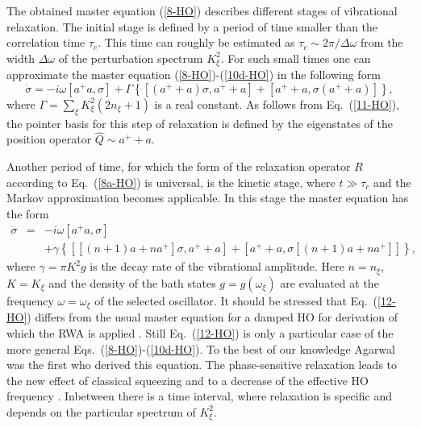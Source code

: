 \documentclass[12pt,twoside,a4paper]{report}
\begin{document}
The obtained master equation (\ref{8-HO})
describes different stages of vibrational relaxation. 
The initial stage is defined by a period of time smaller than the
correlation time $\tau _c$. 
This time can roughly be estimated as  $\tau _c\sim 2\pi/\Delta \omega $ from the width $\Delta \omega $ of the
perturbation spectrum $K_\xi ^2$.
For such small times one can approximate
the master equation (\ref{8-HO})-(\ref{10d-HO}) in the following form
\begin{equation}
  \dot{\sigma} 
        = -{{i}}\omega \left[ a^{+}a,\sigma \right] \label{11-HO}  
            +\Gamma
                \left\{
                    \left[
                        \left( a^{+}+a \right) \sigma ,a^{+}+a 
                    \right]
                   +\left[ 
                         a^{+}+a ,\sigma\left( a^{+}+a \right) 
                    \right]  
                \right\} ,
\end{equation}
where 
$\Gamma 
=\sum_\xi K_\xi ^2\left( 2 n_\xi+1\right) $ 
is a real constant. As follows from Eq.~(\ref{11-HO}),
the pointer basis for this step of relaxation is defined by the
eigenstates of the position operator 
$\hat{Q}\sim a^{+}+a $. 

Another period of time, for which the form of the
relaxation operator $R$ according to Eq.~(\ref{8a-HO}) is universal, is the
kinetic stage, where $t\gg \tau _c$ and the Markov approximation
becomes applicable. In this stage the master equation has the form
\begin{eqnarray}
 \dot{
\sigma} 
    &=&
       - {{i}}\omega 
              \left[ 
                   a^{+}a,\sigma 
              \right] \label{12-HO} \\ 
   & & 
       + \gamma 
         \left\{
             \left[ 
                \left[
                   (n+1) a+na^{+}
                \right] \sigma, 
                a^{+}+a 
             \right]  
           + \left[ 
                a^{+}+a,
                \sigma
                \left[
                   (n+1) a+na^{+}
                \right] 
              \right]
         \right\}, \nonumber
\end{eqnarray}
where $ \gamma =\pi K^2 g $ is the decay rate of the vibrational
amplitude.
Here $n=n_\xi$, $K=K_\xi$ and the density of the bath states
$g=g(\omega_\xi)$ are evaluated at the frequency $\omega=\omega_\xi$
of the selected oscillator.
It should be stressed that Eq.~(\ref{12-HO}) differs from the usual
master equation for a damped HO for derivation of
which the RWA is applied \cite{5,6,7,8,10,11,12,13}. 
Still Eq.~(\ref{12-HO}) is only a particular case of the more general
Eqs.~(\ref{8-HO})-(\ref{10d-HO}).
To the best of our knowledge Agarwal~\cite{agar71} was the first who derived 
this equation. 
The phase-sensitive
relaxation leads to the new effect of classical squeezing 
and to a decrease of the effective HO frequency \cite{schr96}.
Inbetween there is a time interval, where relaxation
is specific and depends on the particular spectrum of $K_\xi ^2$.
\end{document}
